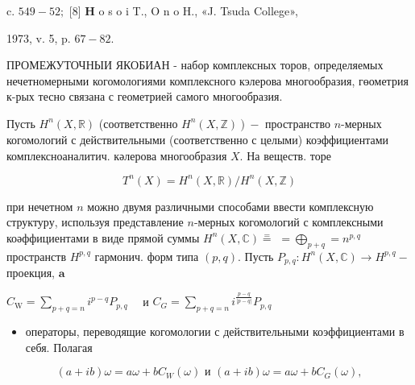 \documentclass[10pt]{article}
\begin{document}
c. $549-52 ;$ [8] $\mathbf{H}$ o s o i T., O n o H., «J. Tsuda College»,

1973, v. 5, p. $67-82$.



ПРОМЕЖУТОЧНЫИ ЯКОБИАН - набор комплексных торов, определяемых нечетномерными когомологиями комплексного кэлерова многообразия, гөометрия к-рых тесно связана с геометрией самого многообразия.



Пусть $H^{n}(X, \mathbb{R})$ (соответственно $\left.H^{n}(X, \mathbb{Z})\right)-$ пространство $n$-мерных когомологий с действительными (соответственно с целыми) коэффициентами комплексноаналитич. кәлерова многообразия $X$. На веществ. торе



\[

T^{n}(X)=H^{n}(X, \mathbb{R}) / H^{n}(X, \mathbb{Z})

\]



при нечетном $n$ можно двумя различными способами ввести комплексную структуру, используя представление $n$-мерных когомологий с комплексными коәффициентами в виде прямой суммы $H^{n}(X, \mathbb{C}) \stackrel{=}{=}$ $=\bigoplus_{p+q}=n^{p, q}$ пространств $H^{p, q}$ гармонич. форм типа $(p, q)$. Пусть $P_{p, q}: H^{n}(X, \mathbb{C}) \rightarrow H^{p, q}-$ проекция, $\mathbf{a}$



$C_{\mathrm{W}}=\sum_{p+q=n} i^{p-q} P_{p, q} \quad$ и $C_{G}=\sum_{p+q=n} i^{\frac{p-q}{|p-q|}} P_{p, q}$



\begin{itemize}

  \item операторы, переводящие когомологии с действительными коэффициентами в себя. Полагая

\end{itemize}



\[

(a+i b) \omega=a \omega+b C_{W}(\omega) \text { и }(a+i b) \omega=a \omega+b C_{G}(\omega),

\]
\end{document}
